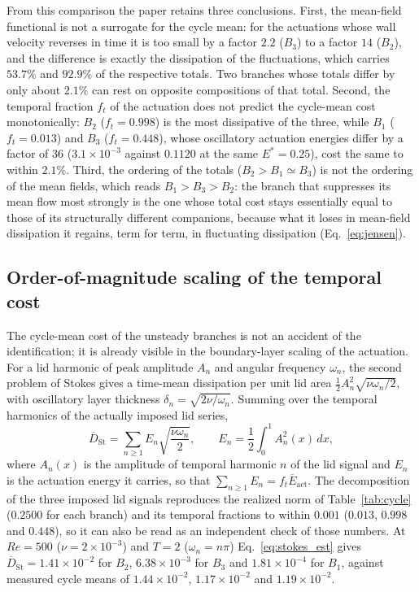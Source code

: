 \documentclass[11pt,a4paper]{article}
\newcommand{\Dbar}{\overline{D}}
\newenvironment{chgadd}{\par\color{blue}}{\par\color{black}}
\begin{document}
\begin{chgadd}
From this comparison the paper retains three conclusions. First, the
mean-field functional is not a surrogate for the cycle mean: for the actuations
whose wall velocity reverses in time it is too small by a factor $2.2$ ($B_3$) to
a factor $14$ ($B_2$), and the difference is exactly the dissipation of the
fluctuations, which carries $53.7\%$ and $92.9\%$ of the respective totals. Two
branches whose totals differ by only about $2.1\%$ can rest on opposite compositions of
that total. Second, the temporal fraction $f_t$ of the actuation does not predict
the cycle-mean cost monotonically: $B_2$ ($f_t=0.998$) is the most dissipative of
the three, while $B_1$ ($f_t=0.013$) and $B_3$ ($f_t=0.448$), whose oscillatory
actuation energies differ by a factor of $36$ ($3.1\times10^{-3}$ against
$0.1120$ at the same $E^\ast=0.25$), cost the same to within $2.1\%$.
Third, the ordering of the totals ($B_2>B_1\simeq B_3$) is not the ordering of the
mean fields, which reads $B_1>B_3>B_2$: the branch that suppresses its mean flow
most strongly is the one whose total cost stays essentially equal to those of its
structurally different companions, because what it loses in mean-field dissipation
it regains, term for term, in fluctuating dissipation
(Eq.~\eqref{eq:jensen}).

\subsection{Order-of-magnitude scaling of the temporal cost}
\label{sec:scaling}

The cycle-mean cost of the unsteady branches is not an accident of the
identification; it is already visible in the boundary-layer scaling of the
actuation. For a lid harmonic of peak amplitude $A_n$ and angular frequency
$\omega_n$, the second problem of Stokes gives a time-mean dissipation per unit
lid area $\tfrac12 A_n^2\sqrt{\nu\omega_n/2}$, with oscillatory layer thickness
$\delta_n=\sqrt{2\nu/\omega_n}$. Summing over the temporal harmonics of the
actually imposed lid series,
\begin{equation}
\Dbar_{\mathrm{St}}=\sum_{n\ge1}E_n\sqrt{\frac{\nu\omega_n}{2}},
\qquad
E_n=\frac12\int_0^1 A_n^2(x)\,dx ,
\label{eq:stokes_est}
\end{equation}
where $A_n(x)$ is the amplitude of temporal harmonic $n$ of the lid signal and
$E_n$ is the actuation energy it carries, so that
$\sum_{n\ge1}E_n=f_t\overline{E}_{\mathrm{act}}$. The decomposition of the
three imposed lid signals reproduces the realized norm of Table~\ref{tab:cycle}
($0.2500$ for each branch) and its temporal fractions to within $0.001$ ($0.013$,
$0.998$ and $0.448$), so it can also be read as an independent check of those
numbers. At $Re=500$ ($\nu=2\times10^{-3}$) and $T=2$ ($\omega_n=n\pi$)
Eq.~\eqref{eq:stokes_est} gives $\Dbar_{\mathrm{St}}=1.41\times10^{-2}$ for $B_2$,
$6.38\times10^{-3}$ for $B_3$ and $1.81\times10^{-4}$ for $B_1$, against measured
cycle means of $1.44\times10^{-2}$, $1.17\times10^{-2}$ and
$1.19\times10^{-2}$.


\end{chgadd}
\end{document}
